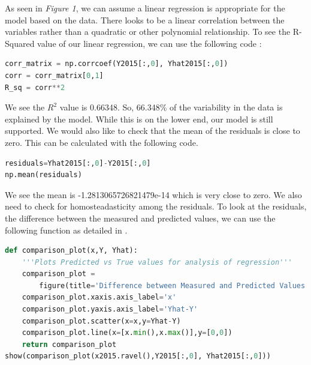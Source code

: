 \documentclass[12pt]{article}
\begin{document}
\noindent
As seen in \textit{Figure 1}, we can assume a linear regression is appropriate for the model based on the data. There looks to be a linear correlation between the variables rather than a quadratic or other polynomial relationship. To see the R-Squared value of our linear regression, we can use the following code \citep{pythonr2}:
\begin{lstlisting}[language=Python]
corr_matrix = np.corrcoef(Y2015[:,0], Yhat2015[:,0])
corr = corr_matrix[0,1]
R_sq = corr**2
\end{lstlisting}
\noindent
We see the $R^2$ value is 0.66348. So, 66.348\% of the variability in the data is explained by the model. While this is on the lower end, our model is still supported. We would also like to check that the mean of the residuals is close to zero. This can be calculated with the following code.
\begin{lstlisting}[language=Python]
residuals=Yhat2015[:,0]-Y2015[:,0]
np.mean(residuals)
\end{lstlisting}
\noindent
We see the mean is -1.2813065726821479e-14 which is very close to zero. We also need to check for homosteadasticity among the residuals. To look at the residuals, the difference between the measured and predicted values, we can use the following function as detailed in \citet{teitelbaum2021linreg}.
\begin{lstlisting}[language=Python]
def comparison_plot(x,Y, Yhat):
    '''Plots Predicted vs True values for analysis of regression'''
    comparison_plot = 
        figure(title='Difference between Measured and Predicted Values')
    comparison_plot.xaxis.axis_label='x'
    comparison_plot.yaxis.axis_label='Yhat-Y'
    comparison_plot.scatter(x=x,y=Yhat-Y)
    comparison_plot.line(x=[x.min(),x.max()],y=[0,0])
    return comparison_plot
show(comparison_plot(x2015.ravel(),Y2015[:,0], Yhat2015[:,0]))
\end{lstlisting}
\end{document}
